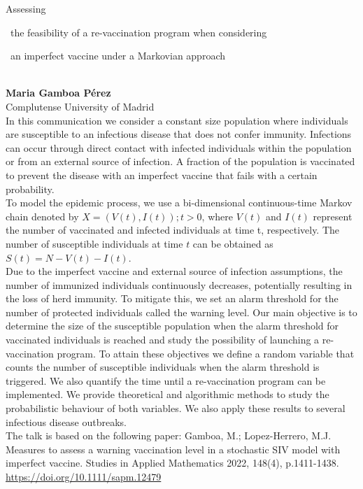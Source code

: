 \documentclass[12pt,a4paper]{article}
\newcommand{\ZAbst}{\rule[-1ex]{0pt}{2ex}\ } %
\begin{document}
\noindent
{\Large Assessing\ZAbst the feasibility of a re-vaccination program when considering\ZAbst an imperfect vaccine under a Markovian approach}\\[1ex]
{\large 
\textbf{Maria Gamboa Pérez}\\[1ex] Complutense University of Madrid}\\[2ex]
In this communication we consider a constant size population where individuals are susceptible to an infectious disease that does not confer immunity. Infections can occur through direct contact with infected individuals within the population or from an external source of infection. A fraction of the population is vaccinated to prevent the disease with an imperfect vaccine that fails with a certain probability.
\\
To model the epidemic process, we use a bi-dimensional continuous-time Markov chain denoted by $X = {(V(t), I(t)); t>0}$, where $V(t)$ and $I(t)$ represent the number of vaccinated and infected individuals at time t, respectively. The number of susceptible individuals at time $t$ can be obtained as $S(t) = N - V(t) - I(t)$.
\\
Due to the imperfect vaccine and external source of infection assumptions, the number of immunized individuals continuously decreases, potentially resulting in the loss of herd immunity. To mitigate this, we set an alarm threshold for the number of protected individuals called the warning level. Our main objective is to determine the size of the susceptible population when the alarm threshold for vaccinated individuals is reached and study the possibility of launching a re-vaccination program.  To attain these objectives we define a random variable that counts the number of susceptible individuals when the alarm threshold is triggered. We also quantify the time until a re-vaccination program can be implemented. We provide theoretical and algorithmic methods to study the probabilistic behaviour of both variables. We also apply these results to  several infectious disease outbreaks.
\\
The talk is based on the following paper: Gamboa, M.; Lopez-Herrero, M.J. Measures to assess a warning vaccination level in a stochastic SIV model with imperfect vaccine. Studies in Applied Mathematics 2022, 148(4), p.1411-1438. \url{https://doi.org/10.1111/sapm.12479}


\bigskip \bigskip  %
\newpage 
\end{document}

